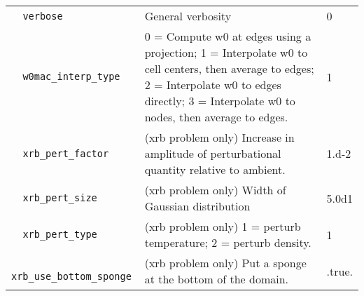 {\begin{center}
\begin{longtable}{|l|p{3.25in}|l|}
\verb=  verbose =  & General verbosity  &  0 \\
\verb=  w0mac_interp_type =  & 0 = Compute w0 at edges using a projection; 1 = 
                                     Interpolate w0 to cell centers, then average to edges; 
                                     2 = Interpolate w0 to edges directly; 3 = Interpolate 
                                     w0 to nodes, then average to edges.  &  1 \\
\verb=  xrb_pert_factor =  & (xrb problem only) Increase in amplitude of 
                                  perturbational quantity relative to ambient. &  1.d-2 \\
\verb=  xrb_pert_size =  & (xrb problem only)  Width of Gaussian distribution &  5.0d1 \\
\verb=  xrb_pert_type =  & (xrb problem only) 1 = perturb temperature; 2 = perturb 
                                density. &  1 \\
\verb=  xrb_use_bottom_sponge =  & (xrb problem only)  Put a sponge at the bottom of 
                                          the domain.  &  .true. \\

\end{longtable}
\end{center}

} %

%

